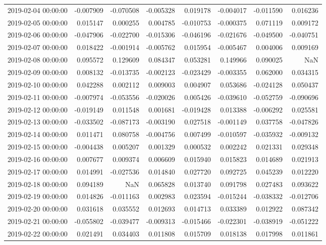 \begin{tabular}{lrrrrrrr}
2019-02-04 00:00:00 & -0.007909 & -0.070508 & -0.005328 & 0.019178 & -0.004017 & -0.011590 & 0.016236 \\
2019-02-05 00:00:00 & 0.015147 & 0.000255 & 0.004785 & -0.010753 & -0.000375 & 0.071119 & 0.009172 \\
2019-02-06 00:00:00 & -0.047906 & -0.022700 & -0.015306 & -0.046196 & -0.021676 & -0.049500 & -0.040751 \\
2019-02-07 00:00:00 & 0.018422 & -0.001914 & -0.005762 & 0.015954 & -0.005467 & 0.004006 & 0.009169 \\
2019-02-08 00:00:00 & 0.095572 & 0.129609 & 0.084347 & 0.053281 & 0.149966 & 0.090025 & NaN \\
2019-02-09 00:00:00 & 0.008132 & -0.013735 & -0.002123 & -0.023429 & -0.003355 & 0.062000 & 0.034315 \\
2019-02-10 00:00:00 & 0.042288 & 0.002112 & 0.009003 & 0.004907 & 0.053686 & -0.024128 & 0.050437 \\
2019-02-11 00:00:00 & -0.007974 & -0.053556 & -0.020026 & 0.005426 & -0.039610 & -0.052759 & -0.090696 \\
2019-02-12 00:00:00 & -0.019149 & 0.011548 & 0.001681 & -0.019428 & 0.013388 & -0.006292 & 0.025581 \\
2019-02-13 00:00:00 & -0.033502 & -0.087173 & -0.003190 & 0.027518 & -0.001149 & 0.037758 & -0.047826 \\
2019-02-14 00:00:00 & 0.011471 & 0.080758 & -0.004756 & 0.007499 & -0.010597 & -0.035932 & -0.009132 \\
2019-02-15 00:00:00 & -0.004438 & 0.005207 & 0.001329 & 0.000532 & 0.002242 & 0.021331 & 0.029348 \\
2019-02-16 00:00:00 & 0.007677 & 0.009374 & 0.006609 & 0.015940 & 0.015823 & 0.014689 & 0.021913 \\
2019-02-17 00:00:00 & 0.014991 & -0.027536 & 0.014840 & 0.027720 & 0.092725 & 0.045239 & 0.012220 \\
2019-02-18 00:00:00 & 0.094189 & NaN & 0.065828 & 0.013740 & 0.091798 & 0.027483 & 0.093622 \\
2019-02-19 00:00:00 & 0.014826 & -0.011163 & 0.002983 & 0.023594 & -0.015244 & -0.038332 & -0.012706 \\
2019-02-20 00:00:00 & 0.031618 & 0.035552 & 0.012693 & 0.014713 & 0.033389 & 0.012922 & 0.087342 \\
2019-02-21 00:00:00 & -0.055802 & -0.039477 & -0.009313 & -0.015466 & -0.022301 & -0.038919 & -0.051222 \\
2019-02-22 00:00:00 & 0.021491 & 0.034403 & 0.011808 & 0.015709 & 0.018138 & 0.017998 & 0.011861 \\

\end{tabular}
